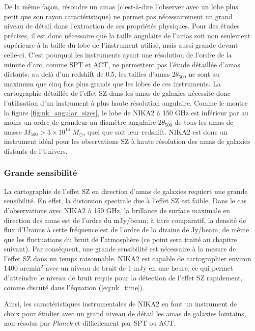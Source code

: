 De la même façon, résoudre un amas (c'est-à-dire l'observer avec un lobe plus petit que son rayon caractéristique) ne permet pas nécessairement un grand niveau de détail dans l'extraction de ses propriétés physiques.
Pour des études précises, il est donc nécessaire que la taille angulaire de l'amas soit non seulement supérieure à la taille du lobe de l'instrument utilisé, mais aussi grande devant celle-ci.
C'est pourquoi les instruments ayant une résolution de l'ordre de la minute d'arc, comme SPT et ACT, ne permettent pas l'étude détaillée d'amas distants: au delà d'un redshift de 0.5, les tailles d'amas $2\theta_{500}$ ne sont au maximum que cinq fois plus grands que les lobes de ces instruments.
La cartographie détaillée de l'effet SZ dans les amas de galaxies nécessite donc l'utilisation d'un instrument à plus haute résolution angulaire.
Comme le montre la figure \ref{fig:nk_angular_sizes}, le lobe de NIKA2 à 150 GHz est inférieur par au moins un ordre de grandeur au diamètre angulaire $2\theta_{500}$ de tous les amas de masse $M_{500} > 3 \times 10^{14} \;M_\odot$, quel que soit leur redshift.
NIKA2 est donc un instrument idéal pour les observations SZ à haute résolution des amas de galaxies distants de l'Univers.

\subsubsection{Grande sensibilité} %
La cartographie de l'effet SZ en direction d'amas de galaxies requiert une grande sensibilité.
En effet, la distorsion spectrale due à l'effet SZ est faible.
Dans le cas d'observations avec NIKA2 à 150 GHz, la brillance de surface maximale en direction des amas est de l'ordre du mJy/beam; à titre comparatif, la densité de flux d'Uranus à cette fréquence est de l'ordre de la dizaine de Jy/beam, de même que les fluctuations du bruit de l'atmosphère (ce point sera traité au chapitre suivant).
Par conséquent, une grande sensibilité est nécessaire à la mesure de l'effet SZ dans un temps raisonnable.
NIKA2 est capable de cartographier environ 1400 arcmin$^2$ avec un niveau de bruit de 1 mJy en une heure, ce qui permet d'atteindre le niveau de bruit requis pour la détection de l'effet SZ rapidement, comme discuté dans l'équation (\ref{eq:nk_time}).

\vspace{20pt}

Ainsi, les caractéristiques instrumentales de NIKA2 en font un instrument de choix pour étudier avec un grand niveau de détail les amas de galaxies lointains, non-résolus par \textit{Planck} et difficilement par SPT ou ACT.

